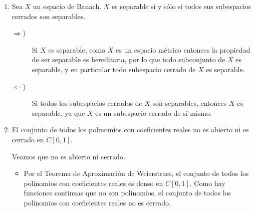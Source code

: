 \documentclass[12pt]{article}
\begin{document}
\begin{ejercicio}
\begin{enumerate}
            Por tanto, como esta igualdad es válida para todo $n\in \mathbb{N}$, no existe una constante $C>0$ tal que $\|T(x)\|\leq C\|x\|$ para todo $x\in c_{00}$, por lo que $T$ no es continuo.\\

            Como $c_{00}$ no es de Banach, lo extendemos a $c_0$. Por el Lema de Zorn, se puede extender $\{e_n\}_{n\in \mathbb{N}}$ a una base algebraica de $c_0$, que denotamos por $\cc{B}$:
            \begin{equation*}
                \cc{B} = \{e_n\}_{n\in \mathbb{N}}\cup \cc{B}'\qquad \cc{B}'\subset c_0\qquad \cc{B}'\cap \{e_n\}_{n\in \mathbb{N}} = \emptyset
            \end{equation*}

            Definimos entonces el funcional lineal $T: c_0\to \bb{R}$ definido en su base por:
            \begin{align*}
                T(e_n) &= n \qquad \forall n\in \mathbb{N}\\
                T(u) &= 0 \qquad \forall u\in \cc{B}'
            \end{align*}

            Este funcional es lineal, pero no es continuo por la misma razón que antes. Por tanto, hemos encontrado un operador lineal de $c_0$ en $\bb{R}$ que no es continuo, y el resultado es falso.


            \item Sea $X$ un espacio de Banach. $X$ es separable si y sólo si todos sus subespacios cerrados son separables.
            \begin{description}
                \item[$\Longrightarrow$)] Si $X$ es separable, como $X$ es un espacio métrico entonces la propiedad de ser separable es hereditaria, por lo que todo subconjunto de $X$ es separable, y en particular todo subespacio cerrado de $X$ es separable.
                \item[$\Longleftarrow$)] Si todos los subespacios cerrados de $X$ son separables, entonces $X$ es separable, ya que $X$ es un subespacio cerrado de sí mismo.
            \end{description}
            \item El conjunto de todos los polinomios con coeficientes reales no es abierto ni es cerrado en $C[0,1]$.
            
            Veamos que no es abierto ni cerrado.
            \begin{itemize}
                \item Por el Teorema de Aproximación de Weierstrass, el conjunto de todos los polinomios con coeficientes reales es denso en $C[0,1]$. Como hay funciones continuas que no son polinomios, el conjunto de todos los polinomios con coeficientes reales no es cerrado. 
                

\end{itemize}
\end{enumerate}
\end{ejercicio}
\end{document}
